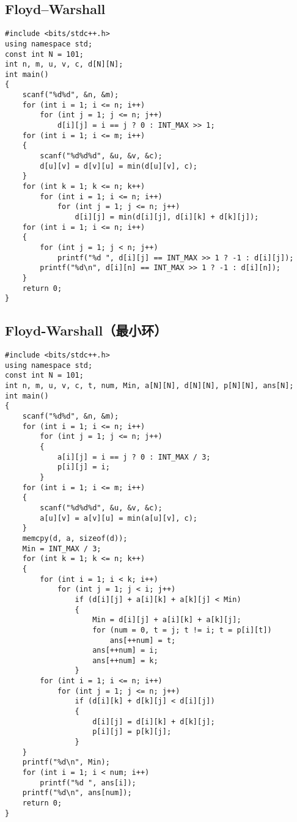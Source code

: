 \documentclass[a4paper]{article}
\begin{document}
\subsection{Floyd–Warshall}
\begin{lstlisting}
#include <bits/stdc++.h>
using namespace std;
const int N = 101;
int n, m, u, v, c, d[N][N];
int main()
{
    scanf("%d%d", &n, &m);
    for (int i = 1; i <= n; i++)
        for (int j = 1; j <= n; j++)
            d[i][j] = i == j ? 0 : INT_MAX >> 1;
    for (int i = 1; i <= m; i++)
    {
        scanf("%d%d%d", &u, &v, &c);
        d[u][v] = d[v][u] = min(d[u][v], c);
    }
    for (int k = 1; k <= n; k++)
        for (int i = 1; i <= n; i++)
            for (int j = 1; j <= n; j++)
                d[i][j] = min(d[i][j], d[i][k] + d[k][j]);
    for (int i = 1; i <= n; i++)
    {
        for (int j = 1; j < n; j++)
            printf("%d ", d[i][j] == INT_MAX >> 1 ? -1 : d[i][j]);
        printf("%d\n", d[i][n] == INT_MAX >> 1 ? -1 : d[i][n]);
    }
    return 0;
}
\end{lstlisting}
\subsection{Floyd-Warshall（最小环）}
\begin{lstlisting}
#include <bits/stdc++.h>
using namespace std;
const int N = 101;
int n, m, u, v, c, t, num, Min, a[N][N], d[N][N], p[N][N], ans[N];
int main()
{
    scanf("%d%d", &n, &m);
    for (int i = 1; i <= n; i++)
        for (int j = 1; j <= n; j++)
        {
            a[i][j] = i == j ? 0 : INT_MAX / 3;
            p[i][j] = i;
        }
    for (int i = 1; i <= m; i++)
    {
        scanf("%d%d%d", &u, &v, &c);
        a[u][v] = a[v][u] = min(a[u][v], c);
    }
    memcpy(d, a, sizeof(d));
    Min = INT_MAX / 3;
    for (int k = 1; k <= n; k++)
    {
        for (int i = 1; i < k; i++)
            for (int j = 1; j < i; j++)
                if (d[i][j] + a[i][k] + a[k][j] < Min)
                {
                    Min = d[i][j] + a[i][k] + a[k][j];
                    for (num = 0, t = j; t != i; t = p[i][t])
                        ans[++num] = t;
                    ans[++num] = i;
                    ans[++num] = k;
                }
        for (int i = 1; i <= n; i++)
            for (int j = 1; j <= n; j++)
                if (d[i][k] + d[k][j] < d[i][j])
                {
                    d[i][j] = d[i][k] + d[k][j];
                    p[i][j] = p[k][j];
                }
    }
    printf("%d\n", Min);
    for (int i = 1; i < num; i++)
        printf("%d ", ans[i]);
    printf("%d\n", ans[num]);
    return 0;
}
\end{lstlisting}
\end{document}
